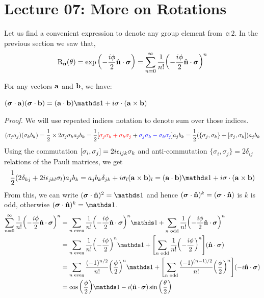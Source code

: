 \section*{Lecture 07: More on Rotations}
Let us find a convenient expression to denote any group element from $\sun{2}$. In the previous section we saw that, 
\begin{align*}
    \mathrm{R}_{\hat{\vb{n}}}\qty(\theta) = \exp\qty(-\frac{i\phi}{2}\hat{\vb{n}}\cdot \boldsymbol{\sigma}) = \sum\limits_{n=0}^\infty \frac{1}{n!}\qty(-\frac{i\phi}{2}\vb{\hat{n}}\cdot \boldsymbol{\sigma})^n
\end{align*}
\begin{identity}
    For any vectors $\vb{a}$ and $\vb{b}$, we have:
\begin{center}
    $(\vbs{\sigma}\cdot \vb{a})(\vbs{\sigma}\cdot \vb{b}) = (\vb{a}\cdot \vb{b})\iden + i \sigma\cdot (\vb{a}\times \vb{b})$
\end{center}
\end{identity}
\noindent
\textit{Proof.} We will use repeated indices notation to denote sum over those indices. 
\begin{align*}
    (\sigma_j a_j)(\sigma_k b_k) =\frac{1}{2}\times 2\sigma_j \sigma_k a_j b_k
    =\frac{1}{2}\qty[\mathcolor{red}{\sigma_j\sigma_k + \sigma_k \sigma_j} + \mathcolor{blue}{\sigma_j\sigma_k - \sigma_k \sigma_j}] a_j b_k =\frac{1}{2}\qty(\{\sigma_j, \sigma_k\} + \comtr{\sigma_j}{\sigma_k})a_jb_k
\end{align*}
Using the commutation $\left[ \sigma_i, \sigma_j \right] = 2i\epsilon_{ijk}\sigma_k$ and anti-commutation $\{\sigma_i, \sigma_j\} =2\delta_{ij}$ relations of the Pauli matrices, we get 
\begin{align*}
    \frac{1}{2}(2\delta_{kj} + 2i \epsilon_{jkl}\sigma_l)a_j b_k =a_j b_k \delta_{jk} + i \sigma_l (\vb{a}\times \vb{b})_l  =(\vb{a}\cdot \vb{b})\iden + i \sigma\cdot (\vb{a}\times \vb{b})
\end{align*}
From this, we can write $(\vbs{\sigma}\cdot \vb{\hat{n}})^2=\iden$ and hence $(\boldsymbol{\sigma}\cdot \vb{\hat{n}})^k = (\boldsymbol{\sigma}\cdot \vb{\hat{n}})$ is $k$ is odd, otherwise $(\vbs{\sigma}\cdot \vb{\hat{n}})^k = \iden$.
\begin{align*}
    \sum\limits_{n=0}^\infty \frac{1}{n!}\qty(-\frac{i\phi}{2}\vb{\hat{n}}\cdot \vbs{\sigma})^n &= \sum\limits_{n  \text{ even}} \frac{1}{n!}\qty(-\frac{i\phi}{2}\vb{\hat{n}}\cdot \vbs{\sigma})^n\iden+\sum\limits_{n  \text{ odd}} \frac{1}{n!}\qty(-\frac{i\phi}{2}\vb{\hat{n}}\cdot \vbs{\sigma})^n\\
    &=\sum\limits_{n  \text{ even}} \frac{1}{n!}\qty(-\frac{i\phi}{2})^n\iden+\qty[\sum\limits_{n  \text{ odd}} \frac{1}{n!}\qty(-\frac{i\phi}{2})^n] \qty(\vb{\hat{n}}\cdot \vbs{\sigma})\\
    &=\sum\limits_{n  \text{ even}} \frac{(-1)^{n/2}}{n!}\qty(\frac{\phi}{2})^n\iden+\qty[\sum\limits_{n  \text{ odd}} \frac{(-1)^{(n-1)/2}}{n!}\qty(\frac{\phi}{2})^n] \qty(-i\vb{\hat{n}}\cdot \vbs{\sigma})\\
    &=\cos\qty(\frac{\phi}{2})\iden -i(\hat{\vb{n}}\cdot \vbs{\sigma})\sin\qty(\frac{\theta}{2})
\end{align*}
